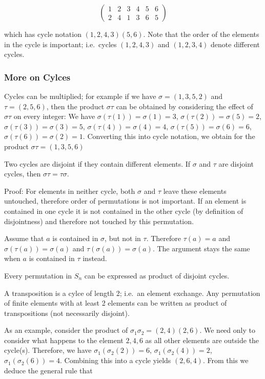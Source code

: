 \[
\begin{pmatrix}
1 & 2 & 3 & 4 & 5 & 6 \\
2 & 4 & 1 & 3 & 6 & 5
\end{pmatrix}
\]

which has cycle notation \((1,2,4,3)(5,6)\). Note that the order of the
elements in the cycle is important; i.e.~cycles \((1,2,4,3)\) and
\((1,2,3,4)\) denote different cycles.

\subsubsection{More on Cylces}\label{more-on-cylces}

Cycles can be multiplied; for example if we have \(\sigma=(1,3,5,2)\)
and \(\tau = (2,5,6)\), then the product \(\sigma \tau\) can be obtained
by considering the effect of \(\sigma \tau\) on every integer: We have
\(\sigma (\tau (1)) = \sigma(1) = 3\),
\(\sigma (\tau (2)) = \sigma(5) = 2\),
\(\sigma (\tau (3)) = \sigma(3) = 5\),
\(\sigma (\tau (4)) = \sigma(4) = 4\),
\(\sigma (\tau (5)) = \sigma(6) = 6\),
\(\sigma (\tau (6)) = \sigma(2) = 1\). Converting this into cycle
notation, we obtain for the product \(\sigma \tau = (1,3,5,6)\)

Two cycles are disjoint if they contain different elements. If
\(\sigma\) and \(\tau\) are disjoint cycles, then
\(\sigma \tau = \tau \sigma\).

Proof: For elements in neither cycle, both \(\sigma\) and \(\tau\) leave
these elements untouched, therefore order of permutations is not
important. If an element is contained in one cycle it is not contained
in the other cycle (by definition of disjointness) and therefore not
touched by this permutation.

Assume that \(a\) is contained in \(\sigma\), but not in \(\tau\).
Therefore \(\tau(a) = a\) and \(\sigma(\tau(a)) = \sigma(a)\) and
\(\tau(\sigma(a)) = \sigma(a)\). The argument stays the same when \(a\)
is contained in \(\tau\) instead.

Every permutation in \(S_n\) can be expressed as product of disjoint
cycles.

A transposition is a cylce of length 2; i.e.~an element exchange. Any
permutation of finite elements with at least 2 elements can be written
as product of transpositions (not necessarily disjoint).

As an example, consider the product of
\(\sigma_1 \sigma_2 = (2,4)(2,6)\). We need only to consider what
happens to the element \(2,4,6\) as all other elements are outside the
cycle(s). Therefore, we have \(\sigma_1(\sigma_2(2)) = 6\),
\(\sigma_1(\sigma_2(4)) = 2\), \(\sigma_1(\sigma_2(6)) = 4\). Combining
this into a cycle yields \((2,6,4)\). From this we deduce the general
rule that

